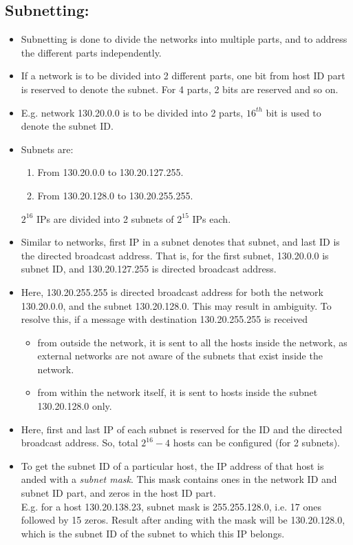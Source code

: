 \documentclass{article}
\begin{document}
	\subsection{Subnetting:}
	\begin{itemize}
		\item Subnetting is done to divide the networks into multiple parts, and to address the different parts independently.
		\item If a network is to be divided into 2 different parts, one bit from host ID part is reserved to denote the subnet. For 4 parts, 2 bits are reserved and so on.
		\item E.g. network 130.20.0.0 is to be divided into 2 parts, $16^{th}$ bit is used to denote the subnet ID.
		\item Subnets are:
		\begin{enumerate}
			\item From 130.20.0.0 to 130.20.127.255.
			\item From 130.20.128.0 to 130.20.255.255.
		\end{enumerate} $2^{16}$ IPs are divided into 2 subnets of $2^{15}$ IPs each.
		\item Similar to networks, first IP in a subnet denotes that subnet, and last ID is the directed broadcast address. That is, for the first subnet, 130.20.0.0 is subnet ID, and 130.20.127.255 is directed broadcast address.
		\item Here, 130.20.255.255 is directed broadcast address for both the network 130.20.0.0, and the subnet 130.20.128.0. This may result in ambiguity. To resolve this, if a message with destination 130.20.255.255 is received\begin{itemize}
			\item from outside the network, it is sent to all the hosts inside the network, as external networks are not aware of the subnets that exist inside the network.
			\item from within the network itself, it is sent to hosts inside the subnet 130.20.128.0 only.
		\end{itemize}
		\item Here, first and last IP of each subnet is reserved for the ID and the directed broadcast address. So, total $2^{16}-4$ hosts can be configured (for 2 subnets).
		\item To get the subnet ID of a particular host, the IP address of that host is anded with a \textit{subnet mask}. This mask contains ones in the network ID and subnet ID part, and zeros in the host ID part. \\E.g. for a host  130.20.138.23, subnet mask is 255.255.128.0, i.e. 17 ones followed by 15 zeros. Result after anding with the mask will be 130.20.128.0, which is the subnet ID of the subnet to which this IP belongs.

\end{itemize}
\end{document}

